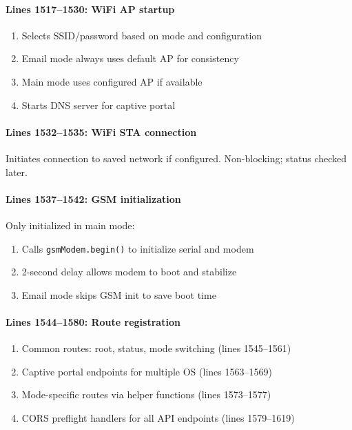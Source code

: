 \documentclass[11pt,a4paper]{article}
\begin{document}
\paragraph{Lines 1517--1530: WiFi AP startup}
\begin{enumerate}[leftmargin=*]
  \item Selects SSID/password based on mode and configuration
  \item Email mode always uses default AP for consistency
  \item Main mode uses configured AP if available
  \item Starts DNS server for captive portal
\end{enumerate}

\paragraph{Lines 1532--1535: WiFi STA connection}
Initiates connection to saved network if configured. Non-blocking; status checked later.

\paragraph{Lines 1537--1542: GSM initialization}
Only initialized in main mode:
\begin{enumerate}[leftmargin=*]
  \item Calls \texttt{gsmModem.begin()} to initialize serial and modem
  \item 2-second delay allows modem to boot and stabilize
  \item Email mode skips GSM init to save boot time
\end{enumerate}

\paragraph{Lines 1544--1580: Route registration}
\begin{enumerate}[leftmargin=*]
  \item Common routes: root, status, mode switching (lines 1545--1561)
  \item Captive portal endpoints for multiple OS (lines 1563--1569)
  \item Mode-specific routes via helper functions (lines 1573--1577)
  \item CORS preflight handlers for all API endpoints (lines 1579--1619)
\end{enumerate}
\end{document}
